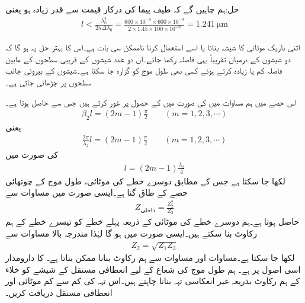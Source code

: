 حل:ہم چاہیں گے کہ طیف پیما کی  درکار قیمت سے قدر زیادہ ہو یعنی
\begin{align*}
l< \frac{\lambda_0^2}{2n\Delta \lambda_0}=\frac{600\times 10^{-9} \times 600 \times 10^{-9}}{2\times 1.45\times 100 \times 10^{-9}}=\SI{1.241}{\micro\meter}
\end{align*}

اتنی باریک موٹائی کا شیشہ بنانا یا اسے استعمال کرنا ناممکن سی بات ہے۔اس کا بہتر حل یہ ہو گا کہ دو شیشوں کے درمیان تقریباً یہی فاصلہ رکھا جائے۔ان دو عدد شیشوں کے قریبی سطحوں کے مابین فاصلہ کم یا زیادہ کرتے ہوئے کسی بھی طول موج کو گزارہ جا سکتا ہے۔شیشوں کے بیرونی جانب سطحوں پر  چڑھائی جاتی ہے۔

اس حصے میں ہم مساوات  میں  کی صورت میں  کے  حصول پر غور کرتے ہیں جس سے  حاصل ہوتا ہے۔
\begin{align*}
\beta_2 l =(2m-1)\frac{\pi}{2} \quad \quad (m=1,2,3,\cdots)
\end{align*}
یعنی
\begin{align*}
\frac{2\pi}{\lambda_2} l =(2m-1)\frac{\pi}{2} \quad \quad (m=1,2,3,\cdots)
\end{align*}
کی صورت میں 
\begin{align}\label{مساوات_مستوی_بے_انعکاس_الف}
l=(2m-1)\frac{\lambda_2}{4}
\end{align}
لکھا جا سکتا ہے جس کے مطابق دوسرے خطے کی موٹائی، طول موج کے چوتھائی حصے کے طاق گنا ہے۔ایسی صورت میں  مساوات  سے
\begin{align}
Z_{\text{داخلی}}=\frac{Z_2^2}{Z_3}
\end{align}
حاصل ہوتا ہے۔ہم دوسرے خطے کی موٹائی کے ذریعہ پہلے خطے کو تیسرے خطے کے ہم رکاوٹ بنا سکتے ہیں۔ایسی صورت میں  ہو گا لہٰذا مندرجہ بالا مساوات سے
\begin{align}\label{مساوات_مستوی_بے_انعکاس_ب}
Z_2=\sqrt{Z_1 Z_3}
\end{align}
لکھا جا سکتا ہے۔مساوات  اور مساوات   سے ہم رکاوٹ بنانا ممکن بناتا ہے۔  کا دارومدار اسی اصول پر ہے۔
ہم  طول موج کی شعاع کے لیے  انعطافی مستقل کے شیشے کو خلاء  کے ہم رکاوٹ بذریعہ غیر انعکاسی تہہ بنانا چاہتے ہیں۔اس تہہ کی کم سے کم موٹائی اور انعطافی مستقل  دریافت کریں۔  

